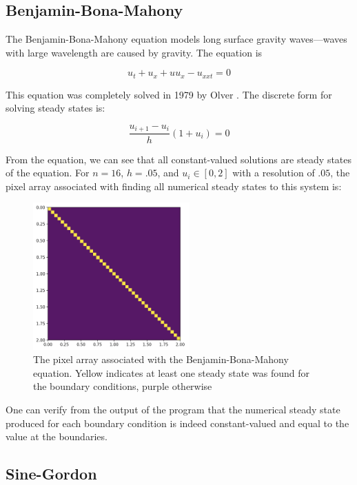 \documentclass[11pt]{article}
\begin{document}
\subsection{Benjamin-Bona-Mahony}\label{sec:bbm}

The Benjamin-Bona-Mahony equation \citep{BBM} models long surface gravity waves---waves with large wavelength are caused by gravity. The equation is

\begin{equation}
\label{bbm}
    u_t + u_x + uu_x - u_{xxt} = 0
\end{equation}

This equation was completely solved in 1979 by Olver \citep{olver_1979}. The discrete form for solving steady states is:

\begin{equation}
    \label{bbm_discrete}
    \frac{u_{i+1} - u_i}{h}(1 + u_i) = 0
\end{equation}

From the equation, we can see that all constant-valued solutions are steady states of the equation. For $n = 16$, $h = .05$, and $u_i \in [0,2]$ with a resolution of $.05$, the pixel array associated with finding all numerical steady states to this system is:

\begin{figure}[h]
\centering
\includegraphics[width=6cm]{images/bbm.png}
\caption{The pixel array associated with the Benjamin-Bona-Mahony equation. Yellow indicates at least one steady state was found for the boundary conditions, purple otherwise}
\label{bbmPixel}
\end{figure}

One can verify from the output of the program that the numerical steady state produced for each boundary condition is indeed constant-valued and equal to the value at the boundaries.

\subsection{Sine-Gordon}\label{sec:sg}
\end{document}
